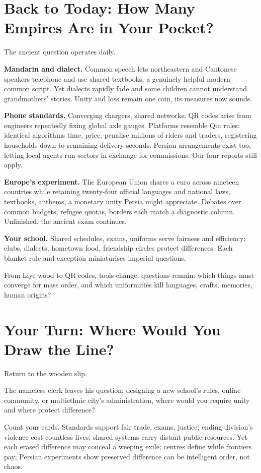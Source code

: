 \section[Today: Empires in Your Pocket]{Back to Today: How Many Empires Are in Your Pocket?}
The ancient question operates daily.

\textbf{Mandarin and dialect.} Common speech lets northeastern and Cantonese speakers telephone and use shared textbooks, a genuinely helpful modern common script. Yet dialects rapidly fade and some children cannot understand grandmothers' stories. Unity and loss remain one coin, its measures now sounds.

\textbf{Phone standards.} Converging chargers, shared networks, QR codes arise from engineers repeatedly fixing global axle gauges. Platforms resemble Qin rules: identical algorithms time, price, penalise millions of riders and traders, registering households down to remaining delivery seconds. Persian arrangements exist too, letting local agents run sectors in exchange for commissions. Our four reports still apply.

\textbf{Europe's experiment.} The European Union shares a euro across nineteen countries while retaining twenty-four official languages and national laws, textbooks, anthems, a monetary unity Persia might appreciate. Debates over common budgets, refugee quotas, borders each match a diagnostic column. Unfinished, the ancient exam continues.

\textbf{Your school.} Shared schedules, exams, uniforms serve fairness and efficiency; clubs, dialects, hometown food, friendship circles protect differences. Each blanket rule and exception miniaturises imperial questions.

From Liye wood to QR codes, tools change, questions remain: which things must converge for mass order, and which uniformities kill languages, crafts, memories, human origins?

\section{Your Turn: Where Would You Draw the Line?}
Return to the wooden slip.

The nameless clerk leaves his question: designing a new school's rules, online community, or multiethnic city's administration, where would you require unity and where protect difference?

Count your cards. Standards support fair trade, exams, justice; ending division's violence cost countless lives; shared systems carry distant public resources. Yet each erased difference may conceal a weeping exile; centres define while frontiers pay; Persian experiments show preserved difference can be intelligent order, not chaos.

